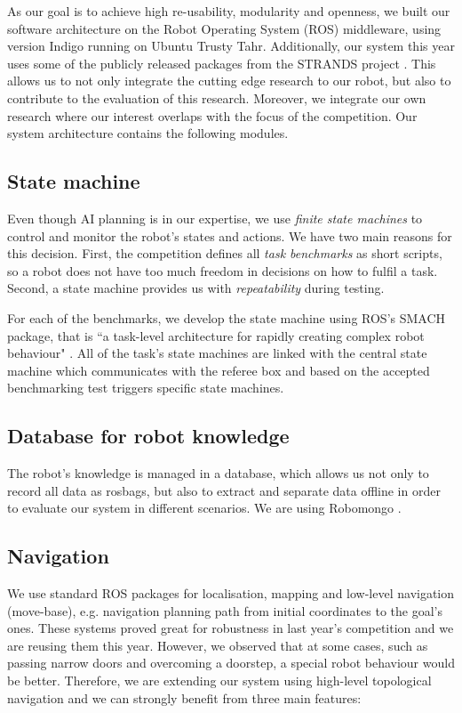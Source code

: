 As our goal is to achieve high re-usability, modularity and openness, we built our software architecture on the Robot Operating System (ROS) middleware, using version Indigo \cite{ros} running on Ubuntu Trusty Tahr. 
Additionally, our system this year uses some of the publicly released packages from the STRANDS project \cite{strands}. 
This allows us to not only integrate the cutting edge research to our robot, but also to contribute to the evaluation of this research. 
Moreover, we integrate our own research where our interest overlaps with the focus of the competition.
Our system architecture contains the following modules.

\subsection{State machine}

Even though AI planning is in our expertise, we use \textit{finite state machines} to control and monitor the robot's states and actions. 
We have two main reasons for this decision. First, the competition defines all \textit{task benchmarks} as short scripts, so a robot does not have too much freedom in decisions on how to fulfil a task. Second, a state machine provides us with \textit{repeatability} during testing.


For each of the benchmarks, we develop the state machine using ROS's SMACH package, that is ``a task-level architecture for rapidly creating complex robot behaviour" \cite{smach}. 
All of the task's state machines are linked with the central state machine which communicates with the referee box and based on the accepted benchmarking test triggers specific state machines. 


\subsection{Database for robot knowledge}

The robot's knowledge is managed in a database, which allows us not only to record all data as rosbags, but also to extract and separate data offline in order to evaluate our system in different scenarios. 
We are using Robomongo \cite{robomongo}.

\subsection{Navigation}

We use standard ROS packages for localisation, mapping and low-level navigation (move-base), e.g. navigation planning path from initial coordinates to the goal's ones. 
These systems proved great for robustness in last year's competition and we are reusing them this year. However, we observed that at some cases, such as passing narrow doors and overcoming a doorstep, a special robot behaviour would be better. 
Therefore, we are extending our system using high-level topological navigation \cite{jaime} and we can strongly benefit from three main features:

